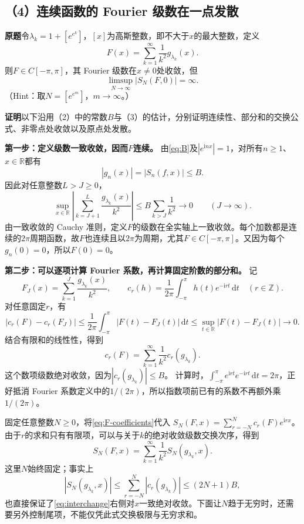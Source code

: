 \documentclass[11pt,a4paper]{ctexart}
\newcommand{\R}{\mathbb R}
\newcommand{\ii}{\mathrm i}
\newcommand{\dd}{\,\mathrm d}
\newcommand{\proofstart}{\par\noindent\textbf{证明}\quad}
\begin{document}
\subsection*{（4）连续函数的 Fourier 级数在一点发散}
\noindent\textbf{原题}\quad 令$\lambda_k=1+[e^{e^k}]$，$[x]$为高斯整数，即不大于$x$的最大整数，定义
\[
 F(x)=\sum_{k=1}^{\infty}\frac1{k^2}g_{\lambda_k}(x).
\]
则$F\in C[-\pi,\pi]$，其 Fourier 级数在$x\ne0$处收敛，但
\[
 \limsup_{N\to\infty}|S_N(F,0)|=\infty.
\]
（Hint：取$N=[e^{e^m}]$，$m\to\infty$。）

\proofstart 以下沿用（2）中的常数$B$与（3）的估计，分别证明连续性、部分和的交换公式、非零点处收敛以及原点处发散。

\textbf{第一步：定义级数一致收敛，因而$F$连续。}
由\eqref{eq:B}及$|e^{\ii nx}|=1$，对所有$n\ge1$、$x\in\R$都有
\[
 |g_n(x)|=|S_n(f,x)|\le B.
\]
因此对任意整数$L>J\ge0$，
\[
 \sup_{x\in\R}\left|\sum_{k=J+1}^{L}\frac{g_{\lambda_k}(x)}{k^2}\right|
 \le B\sum_{k>J}\frac1{k^2}\longrightarrow0\qquad(J\to\infty).
\]
由一致收敛的 Cauchy 准则，定义$F$的级数在全实轴上一致收敛。每个加数都是连续的$2\pi$周期函数，故$F$也连续且以$2\pi$为周期，尤其$F\in C[-\pi,\pi]$。又因为每个$g_n(0)=0$，所以$F(0)=0$。

\textbf{第二步：可以逐项计算 Fourier 系数，再计算固定阶数的部分和。}
记
\[
 F_J(x)=\sum_{k=1}^{J}\frac{g_{\lambda_k}(x)}{k^2},\qquad
 c_r(h)=\frac1{2\pi}\int_{-\pi}^{\pi}h(t)e^{-\ii rt}\dd t
 \quad(r\in\mathbb Z).
\]
对任意固定$r$，有
\[
 |c_r(F)-c_r(F_J)|
 \le\frac1{2\pi}\int_{-\pi}^{\pi}|F(t)-F_J(t)|\dd t
 \le\sup_{t\in\R}|F(t)-F_J(t)|\longrightarrow0.
\]
结合有限和的线性性，得到
\begin{equation}\label{eq:F-coefficients}
 c_r(F)=\sum_{k=1}^{\infty}\frac1{k^2}c_r(g_{\lambda_k}).
\end{equation}
这个数项级数绝对收敛，因为$|c_r(g_{\lambda_k})|\le B$。
计算时，$\int_{-\pi}^{\pi}e^{\ii rt}e^{-\ii rt}\dd t=2\pi$，正好抵消 Fourier 系数定义中的$1/(2\pi)$，所以指数项前已有的系数不再额外乘$1/(2\pi)$。

固定任意整数$N\ge0$，将\eqref{eq:F-coefficients}代入
$S_N(F,x)=\sum_{r=-N}^{N}c_r(F)e^{\ii rx}$。由于$r$的求和只有有限项，可以与关于$k$的绝对收敛级数交换次序，得到
\begin{equation}\label{eq:interchange}
 S_N(F,x)=\sum_{k=1}^{\infty}\frac1{k^2}S_N(g_{\lambda_k},x).
\end{equation}
这里$N$始终固定；事实上
\[
 |S_N(g_{\lambda_k},x)|
 \le\sum_{r=-N}^{N}|c_r(g_{\lambda_k})|\le(2N+1)B,
\]
也直接保证了\eqref{eq:interchange}右侧对$x$一致绝对收敛。下面让$N$趋于无穷时，还需要另外控制尾项，不能仅凭此式交换极限与无穷求和。
\end{document}

